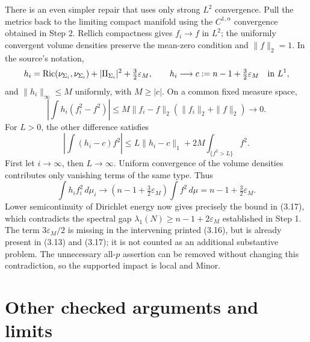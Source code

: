 \documentclass[10pt]{article}
\begin{document}
There is an even simpler repair that uses only strong \(L^2\) convergence. Pull the metrics back to the limiting compact manifold using the \(C^{1,\alpha}\) convergence obtained in Step 2. Rellich compactness gives \(f_i\to f\) in \(L^2\); the uniformly convergent volume densities preserve the mean-zero condition and \(\|f\|_2=1\). In the source’s notation, \[h_i=\operatorname{Ric}(\nu_{\Sigma_i},\nu_{\Sigma_i})
       +|\mathrm{II}_{\Sigma_i}|^2+\tfrac32\varepsilon_M,
 \qquad
 h_i\longrightarrow c:=n-1+\tfrac32\varepsilon_M
 \quad\hbox{in }L^1 ,\] and \(\|h_i\|_\infty\leq M\) uniformly, with \(M\geq|c|\). On a common fixed measure space, \[\left|\int h_i(f_i^2-f^2)\right|
 \leq M\|f_i-f\|_2(\|f_i\|_2+\|f\|_2)\longrightarrow0 .\] For \(L>0\), the other difference satisfies \[\left|\int(h_i-c)f^2\right|
 \leq L\|h_i-c\|_1+
      2M\int_{\{f^2>L\}}f^2 .\] First let \(i\to\infty\), then \(L\to\infty\). Uniform convergence of the volume densities contributes only vanishing terms of the same type. Thus \[\int h_i f_i^2\,d\mu_i\longrightarrow
 \left(n-1+\tfrac32\varepsilon_M\right)\int f^2\,d\mu
 =n-1+\tfrac32\varepsilon_M .\] Lower semicontinuity of Dirichlet energy now gives precisely the bound in (3.17), which contradicts the spectral gap \(\lambda_1(N)\geq n-1+2\varepsilon_M\) established in Step 1. The term \(3\varepsilon_M/2\) is missing in the intervening printed (3.16), but is already present in (3.13) and (3.17); it is not counted as an additional substantive problem. The unnecessary all-\(p\) assertion can be removed without changing this contradiction, so the supported impact is local and Minor.\par
\section*{Other checked arguments and limits}
\end{document}
